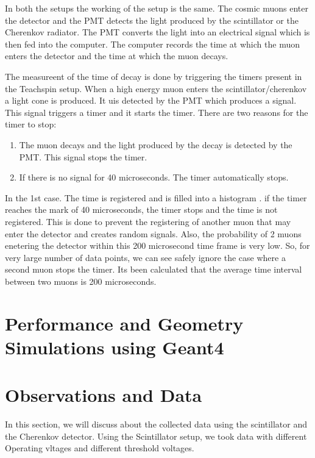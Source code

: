 \documentclass{article}
\begin{document}
\begin{multicols}{2}
In both the setups the working of the setup is the same. The cosmic muons enter the detector and the PMT detects the light produced by the scintillator or the Cherenkov radiator. The PMT converts the light into an electrical signal which is then fed into the computer. The computer records the time at which the muon enters the detector and the time at which the muon decays.

The measureent of the time of decay is done by triggering the timers present in the Teachspin setup. When a high energy muon enters the scintillator/cherenkov a light cone is produced. It uis detected by the PMT which produces a signal. This signal triggers a timer and it starts the timer. There are two reasons for the timer to stop:
\begin{enumerate}
    \item The muon decays and the light produced by the decay is detected by the PMT. This signal stops the timer.
    \item If there is no signal for 40 microseconds. The timer automatically stops.
\end{enumerate}

In the 1st case. The time is registered and is filled into a histogram . if the timer reaches the mark of 40 microseconds, the timer stops and the time is not registered. This is done to prevent the registering of another muon that may enter the detector and creates random signals.
Also, the probability of 2 muons enetering the detector within this 200 microsecond time frame is very low. So, for very large number of data points, we can see safely ignore the case where a second muon stops the timer. Its been calculated that the average time interval between two muons is 200 microseconds.

\section{\label{simobs}Performance and Geometry Simulations using Geant4}
\section{\label{observations}Observations and Data}

In this section, we will discuss about the collected data using the scintillator and the Cherenkov detector. Using the Scintillator setup, we took data with different Operating vltages and different threshold voltages.



\end{multicols}
\end{document}
